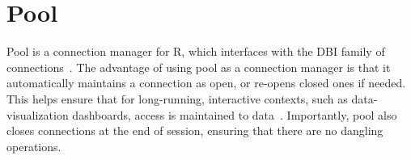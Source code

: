 \section{Pool}

Pool is a connection manager for R, which interfaces with the DBI family of
connections~\cite{hid-sp18-403-R-dbi}. The advantage of using pool as a
connection manager is that it automatically maintains a connection as open, or
re-opens closed ones if needed. This helps ensure that for long-running,
interactive contexts, such as data-visualization dashboards, access is
maintained to data~\cite{hid-sp18-403-R-pool}. Importantly, pool also closes
connections at the end of session, ensuring that there are no dangling
operations.
